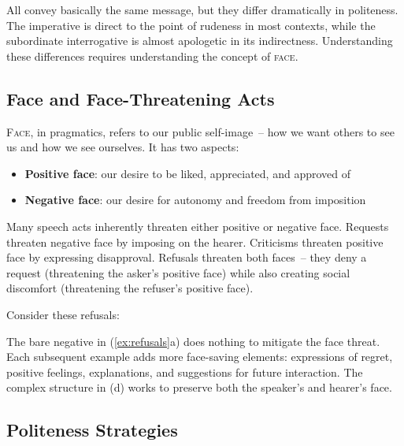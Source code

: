 All convey basically the same message, but they differ dramatically in politeness. The imperative is direct to the point of rudeness in most contexts, while the subordinate interrogative is almost apologetic in its indirectness. Understanding these differences requires understanding the concept of \textsc{face}.

\subsection{Face and Face-Threatening Acts}

\textsc{Face}, in pragmatics, refers to our public self-image~-- how we want others to see us and how we see ourselves. It has two aspects:
\begin{itemize}
    \item \textbf{Positive face}: our desire to be liked, appreciated, and approved of
    \item \textbf{Negative face}: our desire for autonomy and freedom from imposition
\end{itemize}

Many speech acts inherently threaten either positive or negative face. Requests threaten negative face by imposing on the hearer. Criticisms threaten positive face by expressing disapproval. Refusals threaten both faces~-- they deny a request (threatening the asker's positive face) while also creating social discomfort (threatening the refuser's positive face).

Consider these refusals:
\ea \label{ex:refusals}
    \z
\z

The bare negative in (\ref{ex:refusals}a) does nothing to mitigate the face threat. Each subsequent example adds more face-saving elements: expressions of regret, positive feelings, explanations, and suggestions for future interaction. The complex structure in (d) works to preserve both the speaker's and hearer's face.

\subsection{Politeness Strategies}

